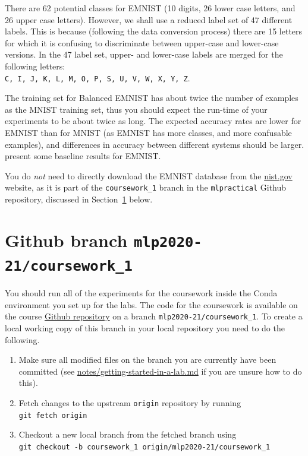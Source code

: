 \documentclass[11pt,]{article}
\begin{document}
There are 62 potential classes for EMNIST (10 digits, 26 lower case letters, and 26 upper case letters).  However, we shall use a reduced label set of 47 different labels.  This is because (following the data conversion process)  there are 15 letters for which it is confusing to discriminate between upper-case and lower-case versions.  In the 47 label set, upper- and lower-case labels are merged for the following letters:\\
\texttt{C, I, J, K, L, M, O, P, S, U, V, W, X, Y, Z}.  

The training set for Balanced EMNIST has about twice the number of examples as the MNIST training set, thus you should expect the run-time of your experiments to be about twice as long.  The expected accuracy rates are lower for EMNIST than for MNIST (as EMNIST has more classes, and more confusable examples), and differences in accuracy between different systems should be larger. \citet{cohen2017emnist} present some baseline results for EMNIST.

You do \emph{not} need to directly download the EMNIST database from the \href{https://www.nist.gov/itl/iad/image-group/emnist-dataset}{nist.gov} website, as it is part of the \verb+coursework_1+ branch in the \verb+mlpractical+ Github repository,  discussed in Section~\ref{sec:code} below.

\newpage
\section{Github branch \texttt{mlp2020-21/coursework\_1}}
\label{sec:code}

You should run all of the experiments for the coursework inside the Conda environment you set up for the labs. The code for the coursework is available on the course \href{https://github.com/VICO-UoE/mlpractical/}{Github repository} on a branch \verb+mlp2020-21/coursework_1+. 
To create a local working copy of this branch in your local repository you need to do the following.

\begin{enumerate}
\def\labelenumi{\arabic{enumi}.}
\itemsep3pt\parskip0pt
\item Make sure all modified files on the branch you are currently have been committed
  (see \href{https://github.com/VICO-UoE/mlpractical/blob/mlp2020-21/lab1/notes/getting-started-in-a-lab.md}{notes/getting-started-in-a-lab.md} if you are unsure how to do this).
\item Fetch changes to the upstream \texttt{origin} repository by running\\
  \texttt{git fetch origin}
\item Checkout a new local branch from the fetched branch using\\
  \verb+git checkout -b coursework_1 origin/mlp2020-21/coursework_1+
\end{enumerate}
\end{document}
